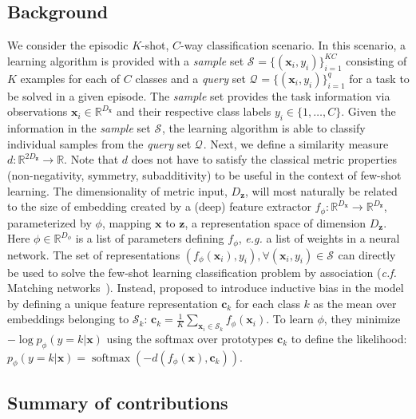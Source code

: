 \documentclass{article}
\renewcommand{\vec}[1]{\mathbf{#1}}
\newcommand{\examples}[1]{\mathcal{S}_{#1}}
\newcommand{\query}[1]{\mathcal{Q}_{#1}}
\newcommand{\querysize}{q}
\newcommand{\featuresize}{{D_{\vec{z}}}}
\newcommand{\imagesize}{{D_{\vec{x}}}}
\newcommand{\phisize}{{D_{\phi}}}
\DeclareMathOperator{\softmax}{softmax}
\begin{document}
\subsection{Background} \label{ssec:definitions}

We consider the episodic $K$-shot, $C$-way classification scenario. In this scenario, a learning algorithm is provided with a \emph{sample} set $\examples{} = \{(\vec{x}_i, y_i) \}_{i=1}^{KC}$ consisting of $K$ examples for each of $C$ classes and a \emph{query} set $\query{} = \{(\vec{x}_i, y_i) \}_{i=1}^{\querysize}$ for a task to be solved in a given episode. The \emph{sample} set provides the task information via observations $\vec{x}_i \in \mathbb{R}^\imagesize$ and their respective class labels $y_i \in \{1, \ldots, C\}$. Given the information in the \emph{sample} set $\examples{}$, the learning algorithm is able to classify individual samples from the \emph{query} set $\query{}$. Next, we define a similarity measure $d : \mathbb{R}^{2 \featuresize} \rightarrow \mathbb{R}$. Note that $d$ does not have to satisfy the classical metric properties (non-negativity, symmetry, subadditivity) to be useful in the context of few-shot learning. The dimensionality of metric input, $\featuresize$, will most naturally be related to the size of embedding created by a (deep) feature extractor $f_{\phi} : \mathbb{R}^{\imagesize} \rightarrow \mathbb{R}^{\featuresize}$, parameterized by $\phi$, mapping $\vec{x}$ to $\vec{z}$, a representation space of dimension $\featuresize$. Here $\phi \in \mathbb{R}^{\phisize}$ is a list of parameters defining $f_{\phi}$, \emph{e.g.} a list of weights in a neural network. The set of representations $(f_{\phi}(\vec{x}_i), y_i), \forall (\vec{x}_i, y_i) \in \examples{}$ can directly be used to solve the few-shot learning classification problem by association (\emph{c.f.} Matching networks~\citep{vinyals2016matching}). Instead, \citet{snell2017prototypical} proposed to introduce inductive bias in the model by defining a unique feature representation $\vec{c}_k$ for each class $k$ as the mean over embeddings belonging to $\examples{k}$: $\vec{c}_k = \frac{1}{K} \sum_{\vec{x}_i \in \examples{k}} f_{\phi}(\vec{x}_i)$. To learn $\phi$, they minimize $-\log p_\phi (y=k | \vec{x})$ using the softmax over prototypes $\mathbf{c}_k$ to define the likelihood: $p_\phi (y=k | \vec{x}) = \softmax(-d(f_{\phi}(\vec{x}), \mathbf{c}_k))$.


\subsection{Summary of contributions} \label{ssec:summary_of_contributions}
\end{document}
